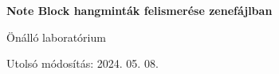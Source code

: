 
\begin{titlepage}
    \begin{center}
        \vspace*{1cm}
            
        \Huge
        \textbf{Note Block hangminták felismerése zenefájlban}
            
        \vspace{0.5cm}
        \LARGE
        Önálló laboratórium
            
        \vspace{2.5cm}
            
            
        \vfill
            
            
        \vspace{0.8cm}
            
            
        \Large
        Utolsó módosítás: 2024. 05. 08.
        \vspace*{1cm}
            
    \end{center}
\end{titlepage}
